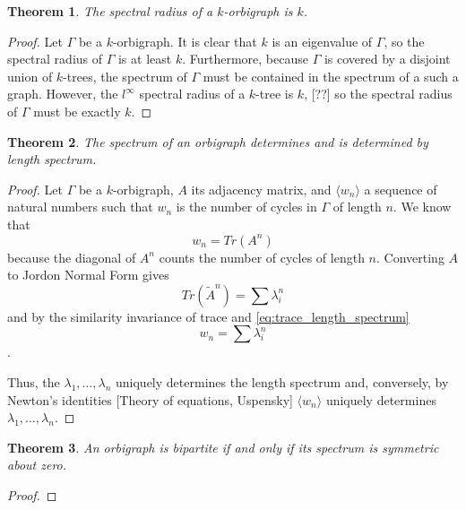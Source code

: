\documentclass[12pt]{article}
\theoremstyle{plain}
\newtheorem{theorem}{Theorem}
\theoremstyle{definition}
\theoremstyle{remark}
\begin{document}
    \begin{theorem}\label{thm:SpectralRadius}
      The spectral radius of a $k$-orbigraph is $k$.
    \end{theorem}
    \begin{proof}
      Let $\Gamma$ be a $k$-orbigraph. It is clear that $k$ is an eigenvalue of $\Gamma$, so the spectral radius of $\Gamma$ is at least $k$. Furthermore, because $\Gamma$ is covered by a disjoint union of $k$-trees, the spectrum of $\Gamma$ must be contained in the spectrum of a such a graph. However, the $l^\infty$ spectral radius of a $k$-tree is $k$, [??] so the spectral radius of $\Gamma$ must be exactly $k$. 
    \end{proof}

    \begin{theorem}\label{thm:LengthSpectrum}
      The spectrum of an orbigraph determines and is determined by length spectrum.
    \end{theorem}
    \begin{proof}
      Let $\Gamma$ be a $k$-orbigraph, $A$ its adjacency matrix, and $\langle w_n \rangle$ a sequence of natural numbers such that $w_n$ is the number of cycles in $\Gamma$ of length $n$. We know that
        \begin{equation}\label{eq:trace_length_spectrum}
          w_n = Tr(A^n)
        \end{equation}
      because the diagonal of $A^n$ counts the number of cycles of length $n$. Converting $A$ to Jordon Normal Form gives
      \begin{equation*}
        Tr(\tilde{A}^n) = \sum \lambda_i^n
      \end{equation*}
      and by the similarity invariance of trace and \ref{eq:trace_length_spectrum}
      \begin{equation*}
        w_n = \sum \lambda_i^n
      \end{equation*}.

      Thus, the $\lambda_1, \ldots, \lambda_n$ uniquely determines the length spectrum and, conversely, by Newton's identities [Theory of equations, Uspensky] $\langle w_n \rangle$ uniquely determines $\lambda_1, \ldots, \lambda_n$.

    \end{proof}

    \begin{theorem}\label{thm:BipartiteSymmetry}
      An orbigraph is bipartite if and only if its spectrum is symmetric about zero.
    \end{theorem}
    \begin{proof}
    \end{proof}
\end{document}
